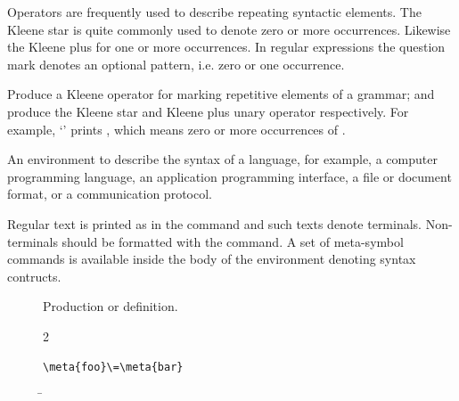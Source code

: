 \documentclass{scrartcl}
\begin{document}
{
Operators are frequently used to describe repeating syntactic
elements.  The Kleene star is quite commonly used to denote zero
or more occurrences.  Likewise the Kleene plus for one or more
occurrences.  In regular expressions the question mark denotes
an optional pattern, i.e. zero or one occurrence.

\begin{definition}
 
Produce a Kleene operator for marking repetitive elements of a
grammar; \code{\\kleene*} and \code{\\kleene+} produce the Kleene
star and Kleene plus unary operator respectively.  For example,
‘’ prints \kleene*, which
means zero or more occurrences of .
\end{definition}

\begin{definition}
An environment to describe the syntax of a language, for example, a
computer programming language, an application programming interface, a
file or document format, or a communication protocol.

Regular text is printed as in the \symb{\code} command and such texts
denote terminals.  Non-terminals should be formatted with the
\symb{\meta} command.  A set of meta-symbol commands is available
inside the body of the  environment denoting syntax
contructs.
\begin{description}
\item[\code{\\=}]
\symindex{\=}
Production or definition.
\begin{multicols}{2}
\begin{verbatim}
\meta{foo}\=\meta{bar}
\end{verbatim}
\columnbreak
\begin{metasyntax}
\=
\end{metasyntax}
\end{multicols}


\end{description}
\end{definition}}
\end{document}
